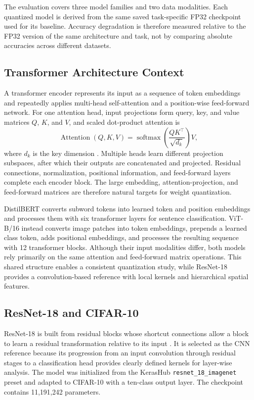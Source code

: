 \documentclass[conference]{IEEEtran}
\begin{document}
The evaluation covers three model families and two data modalities. Each quantized model is derived from the same saved task-specific FP32 checkpoint used for its baseline. Accuracy degradation is therefore measured relative to the FP32 version of the same architecture and task, not by comparing absolute accuracies across different datasets.

\subsection{Transformer Architecture Context}

A transformer encoder represents its input as a sequence of token embeddings and repeatedly applies multi-head self-attention \cite{vaswani2017} and a position-wise feed-forward network. For one attention head, input projections form query, key, and value matrices $Q$, $K$, and $V$, and scaled dot-product attention is
\begin{equation}
\operatorname{Attention}(Q,K,V)
=\operatorname{softmax}\!\left(\frac{QK^{\top}}{\sqrt{d_k}}\right)V,
\end{equation}
where $d_k$ is the key dimension \cite{vaswani2017}. Multiple heads learn different projection subspaces, after which their outputs are concatenated and projected. Residual connections, normalization, positional information, and feed-forward layers complete each encoder block. The large embedding, attention-projection, and feed-forward matrices are therefore natural targets for weight quantization.

DistilBERT converts subword tokens into learned token and position embeddings and processes them with six transformer layers for sentence classification. ViT-B/16 instead converts image patches into token embeddings, prepends a learned class token, adds positional embeddings, and processes the resulting sequence with 12 transformer blocks. Although their input modalities differ, both models rely primarily on the same attention and feed-forward matrix operations. This shared structure enables a consistent quantization study, while ResNet-18 provides a convolution-based reference with local kernels and hierarchical spatial features.

\subsection{ResNet-18 and CIFAR-10}

ResNet-18 is built from residual blocks whose shortcut connections allow a block to learn a residual transformation relative to its input \cite{he2016}. It is selected as the CNN reference because its progression from an input convolution through residual stages to a classification head provides clearly defined kernels for layer-wise analysis. The model was initialized from the KerasHub \texttt{resnet\_18\_imagenet} preset and adapted to CIFAR-10 with a ten-class output layer. The checkpoint contains 11,191,242 parameters.
\end{document}
